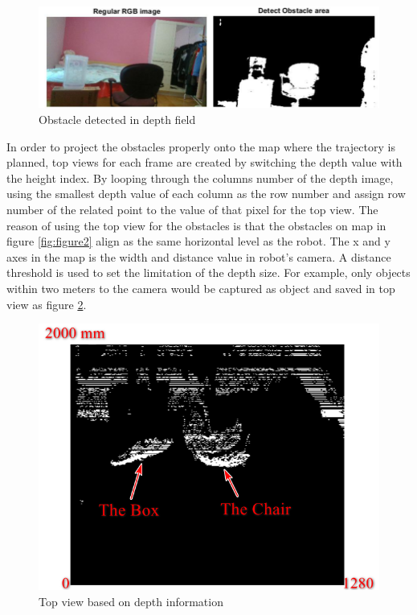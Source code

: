\documentclass[
  oneside]{ubcthesis}
\begin{document}
\begin{figure}

{\centering \includegraphics[width=0.8\linewidth]{figures/3} 

}

\caption{Obstacle detected in depth field}\label{fig:figure3}
\end{figure}



In order to project the obstacles properly onto the map where the trajectory is planned, top views for each frame are created by switching the depth value with the height index. By looping through the columns number of the depth image, using the smallest depth value of each column as the row number and assign row number of the related point to the value of that pixel for the top view. The reason of using the top view for the obstacles is that the obstacles on map in figure \ref{fig:figure2} align as the same horizontal level as the robot. The x and y axes in the map is the width and distance value in robot's camera. A distance threshold is used to set the limitation of the depth size. For example, only objects within two meters to the camera would be captured as object and saved in top view as figure \ref{fig:figure4}.

\begin{figure}

{\centering \includegraphics[width=0.6\linewidth]{figures/4} 

}

\caption{Top view based on depth information}\label{fig:figure4}
\end{figure}
\end{document}
